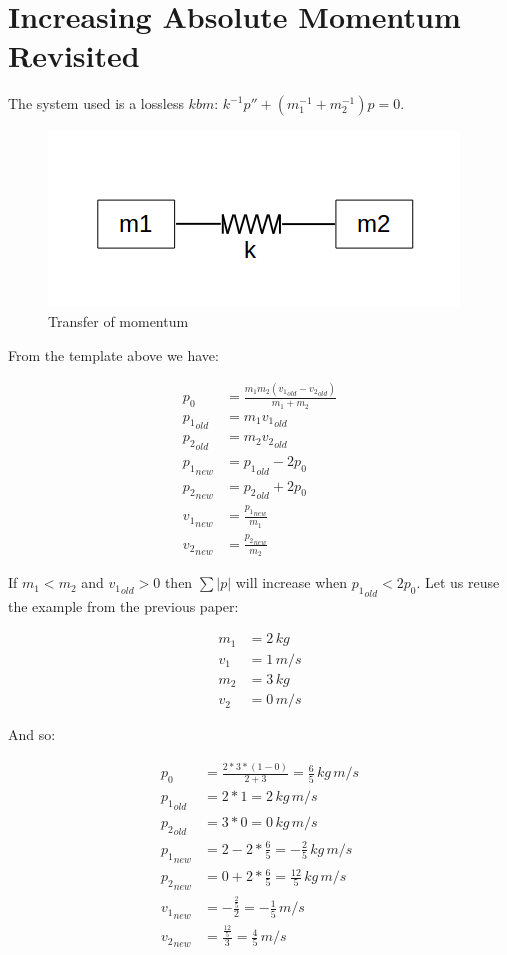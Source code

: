 \documentclass[]{../common/elementary-physics}
\begin{document}
\section{Increasing Absolute Momentum Revisited}

The system used is a lossless $kbm$\cite{analogies}: $k^{-1} p'' + (m_1^{-1} + m_2^{-1}) p = 0$.

\begin{figure}[ht] \centering
	\includegraphics[scale=.3]{mkm} \caption{Transfer of momentum}
\end{figure}

From the template above we have:

\begin{align}
p_0 &= \frac{m_1 m_2 ({v_1}_{old}-{v_2}_{old})}{m_1 + m_2} \\
{p_1}_{old} &= m_1 {v_1}_{old} \\
{p_2}_{old} &= m_2 {v_2}_{old} \\
{p_1}_{new} &= {p_1}_{old} -2 p_0 \\
{p_2}_{new} &= {p_2}_{old} +2 p_0 \\
{v_1}_{new} &= \frac{{p_1}_{new}}{m_1} \\
{v_2}_{new} &= \frac{{p_2}_{new}}{m_2}
\end{align}

If $m_1 < m_2$ and ${v_1}_{old} > 0$ then $\sum |p|$ will increase when ${p_1}_{old} < 2 p_0$.
Let us reuse the example from the previous paper\cite{incmom}:

\begin{align}
m_1 &= 2 \, kg \\
v_1 &= 1 \, m/s \\
m_2 &= 3 \, kg \\
v_2 &= 0 \, m/s
\end{align}

And so:

\begin{align}
p_0 &= \frac{2 * 3 * (1-0)}{2 + 3} = \frac{6}{5} \, kg \, m/s \\
{p_1}_{old} &= 2 * 1 = 2 \, kg \, m/s \\
{p_2}_{old} &= 3 * 0 = 0 \, kg \, m/s \\
{p_1}_{new} &= 2 -2 * \frac{6}{5} = -\frac{2}{5} \, kg \, m/s \\
{p_2}_{new} &= 0 +2 * \frac{6}{5} = \frac{12}{5} \, kg \, m/s \\
{v_1}_{new} &= -\frac{\frac{2}{5}}{2} = -\frac{1}{5} \, m/s \\
{v_2}_{new} &= \frac{\frac{12}{5}}{3} = \frac{4}{5} \, m/s
\end{align}
\end{document}
